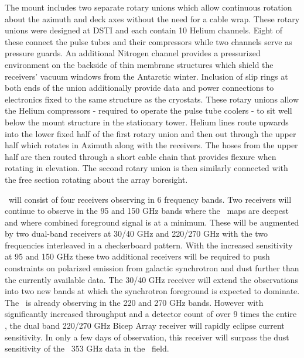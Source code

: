 \documentclass[]{spie}  %
\begin{document}
The \biceparray mount includes two separate rotary unions which allow
continuous rotation about the azimuth and deck axes without the need for a
cable wrap. These rotary unions were designed at DSTI and each contain 10
Helium channels. Eight of these connect the pulse tubes and their compressors
while two channels serve as pressure guards. An additional Nitrogen channel
provides a pressurized environment on the backside of thin membrane
structures which shield the receivers' vacuum windows from the Antarctic winter.
Inclusion of slip rings at both ends of the union additionally provide data and power
connections to electronics fixed to the same structure as the cryostats. These rotary
unions allow the Helium compressors - required to operate the
pulse tube coolers - to sit well below the mount structure in the
stationary tower. Helium lines route upwards into the lower fixed half of the first
rotary union and then out through the upper half which rotates in Azimuth
along with the receivers. The hoses from the upper half are then routed through a
short cable chain that provides flexure when rotating in elevation. The
second rotary union is then similarly connected with the free section rotating
about the array boresight.



\biceparray\ will consist of four receivers observing in 6 frequency bands.
Two receivers will continue to observe in the 95 and 150 GHz bands where the
\bk\ maps are deepest and where combined foreground
signal is at a minimum. These will be augmented by two dual-band receivers at
30/40 GHz and 220/270 GHz with the two frequencies interleaved in a
checkerboard pattern. With the increased sensitivity at 95 and 150 GHz these
two additional receivers will be required to push constraints on polarized
emission from galactic synchrotron and dust further than the currently available data.
The 30/40 GHz receiver will extend the observations into two
new bands at which the synchrotron foreground is expected to dominate. The
\keckarray\ is already observing in the 220 and 270 GHz bands.  However with
significantly increased throughput and a detector count of over 9 times the
entire \keckarray, the dual band 220/270 GHz Bicep Array receiver will rapidly
eclipse current sensitivity. In only a few days of observation,
this receiver will surpass the dust sensitivity of the \planck\ 353 GHz data in
the \bk\ field. 
\end{document}
